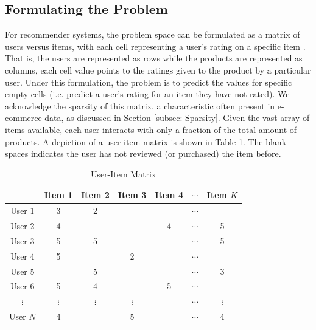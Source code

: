 \subsection{Formulating the Problem}
\label{subsec:4 Formulating the Problem}

For recommender systems, the problem space can be formulated as a matrix of users versus items, with each cell representing a user’s rating on a specific item \cite{jannach2010recommender}. That is, the users are represented as rows while the products are represented as columns, each cell value points to the ratings given to the product by a particular user. Under this formulation, the problem is to predict the values for specific empty cells (i.e. predict a user’s rating for an item they have not rated). We acknowledge the sparsity of this matrix, a characteristic often present in e-commerce data, as discussed in Section \ref{subsec: Sparsity}. Given the vast array of items available, each user interacts with only a fraction of the total amount of products. A depiction of a user-item matrix is shown in Table \ref{tab:user_item_matrix}. The blank spaces indicates the user has not reviewed (or purchased) the item before.

\begin{table}[h]
    \centering
    \begin{tabular}{|c|c|c|c|c|c|c|}
    \hline
     & Item 1 & Item 2 & Item 3 & Item 4 & $\cdots$ & Item $K$ \\
    \hline
    User 1 & 3 & 2 &  &  & $\cdots$ &  \\
    User 2 & 4 &  &  & 4 & $\cdots$ & 5 \\
    User 3 & 5 & 5 & &  & $\cdots$ & 5 \\
    User 4 & 5 & & 2 &  & $\cdots$ &  \\
    User 5 &  & 5 & &  & $\cdots$ & 3 \\
    User 6 & 5 & 4 & &  5& $\cdots$ & \\
    $\vdots$ & $\vdots$ &  $\vdots$ & $\vdots$ &  & $\cdots$ & $\vdots$ \\
    User $N$ & 4 & & 5 &  & $\cdots$ & 4 \\
    \hline
    \end{tabular}
    \caption{User-Item Matrix}
    \label{tab:user_item_matrix}
\end{table}

